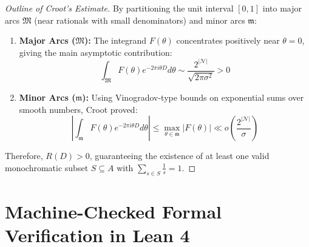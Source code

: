 \documentclass[11pt,a4paper]{article}
\theoremstyle{definition}
\begin{document}
\begin{proof}[Outline of Croot's Estimate]
By partitioning the unit interval $[0, 1]$ into major arcs $\mathfrak{M}$ (near rationals with small denominators) and minor arcs $\mathfrak{m}$:
\begin{enumerate}
    \item \textbf{Major Arcs ($\mathfrak{M}$):} The integrand $F(\theta)$ concentrates positively near $\theta = 0$, giving the main asymptotic contribution:
    \[ \int_{\mathfrak{M}} F(\theta) e^{-2\pi i \theta D} d\theta \sim \frac{2^{|\mathcal{N}|}}{\sqrt{2\pi \sigma^2}} > 0 \]
    \item \textbf{Minor Arcs ($\mathfrak{m}$):} Using Vinogradov-type bounds on exponential sums over smooth numbers, Croot proved:
    \[ \left| \int_{\mathfrak{m}} F(\theta) e^{-2\pi i \theta D} d\theta \right| \le \max_{\theta \in \mathfrak{m}} |F(\theta)| \ll o\left( \frac{2^{|\mathcal{N}|}}{\sigma} \right) \]
\end{enumerate}
Therefore, $R(D) > 0$, guaranteeing the existence of at least one valid monochromatic subset $S \subseteq A$ with $\sum_{s \in S} \frac{1}{s} = 1$.
\end{proof}

\section{Machine-Checked Formal Verification in Lean 4}
\end{document}
